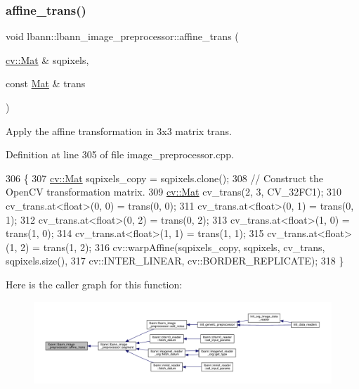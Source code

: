 \subsubsection{\texorpdfstring{affine\+\_\+trans()}{affine\_trans()}}
{\footnotesize\ttfamily void lbann\+::lbann\+\_\+image\+\_\+preprocessor\+::affine\+\_\+trans (\begin{DoxyParamCaption}\item[{\hyperlink{base_8hpp_a68f11fdc31b62516cb310831bbe54d73}{cv\+::\+Mat} \&}]{sqpixels,  }\item[{const \hyperlink{base_8hpp_a68f11fdc31b62516cb310831bbe54d73}{Mat} \&}]{trans }\end{DoxyParamCaption})\hspace{0.3cm}{\ttfamily [protected]}}

Apply the affine transformation in 3x3 matrix trans. 

Definition at line 305 of file image\+\_\+preprocessor.\+cpp.


\begin{DoxyCode}
306                       \{
307   \hyperlink{base_8hpp_a68f11fdc31b62516cb310831bbe54d73}{cv::Mat} sqpixels\_copy = sqpixels.clone();
308   \textcolor{comment}{// Construct the OpenCV transformation matrix.}
309   \hyperlink{base_8hpp_a68f11fdc31b62516cb310831bbe54d73}{cv::Mat} cv\_trans(2, 3, CV\_32FC1);
310   cv\_trans.at<\textcolor{keywordtype}{float}>(0, 0) = trans(0, 0);
311   cv\_trans.at<\textcolor{keywordtype}{float}>(0, 1) = trans(0, 1);
312   cv\_trans.at<\textcolor{keywordtype}{float}>(0, 2) = trans(0, 2);
313   cv\_trans.at<\textcolor{keywordtype}{float}>(1, 0) = trans(1, 0);
314   cv\_trans.at<\textcolor{keywordtype}{float}>(1, 1) = trans(1, 1);
315   cv\_trans.at<\textcolor{keywordtype}{float}>(1, 2) = trans(1, 2);
316   cv::warpAffine(sqpixels\_copy, sqpixels, cv\_trans, sqpixels.size(),
317                  cv::INTER\_LINEAR, cv::BORDER\_REPLICATE);
318 \}
\end{DoxyCode}
Here is the caller graph for this function\+:\nopagebreak
\begin{figure}[H]
\begin{center}
\leavevmode
\includegraphics[width=350pt]{classlbann_1_1lbann__image__preprocessor_adb9e017aeac52a9b5d392f17188d1057_icgraph}
\end{center}
\end{figure}
\mbox{\label{classlbann_1_1lbann__image__preprocessor_a27cb5182c4f764cbfa4edecbb78ef29d}} 
